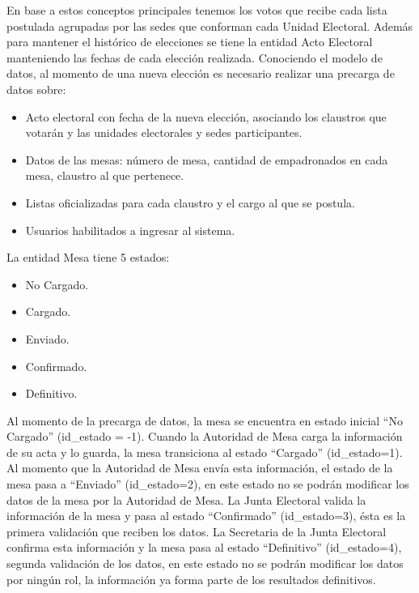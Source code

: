 En base a estos conceptos principales tenemos los votos que recibe cada lista postulada agrupadas por las sedes que conforman cada Unidad Electoral. Además para mantener el histórico de elecciones se tiene la entidad Acto Electoral manteniendo las fechas de cada elección realizada.\newline
Conociendo el modelo de datos, al momento de una nueva elección es necesario realizar una precarga de datos sobre:
\begin{itemize}
    \item Acto electoral con fecha de la nueva elección, asociando los claustros que votarán y las unidades electorales y sedes participantes.
    \item Datos de las mesas: número de mesa, cantidad de empadronados en cada mesa, claustro al que pertenece.
    \item Listas oficializadas para cada claustro y el cargo al que se postula.
    \item Usuarios habilitados a ingresar al sistema.
\end{itemize}
La entidad Mesa tiene 5 estados:
\begin{itemize}
    \item No Cargado.
    \item Cargado.
    \item Enviado.
    \item Confirmado.
    \item Definitivo.
\end{itemize}

Al momento de la precarga de datos, la mesa se encuentra en estado inicial ``No Cargado'' (id\_estado = -1). Cuando la Autoridad de Mesa carga la información de su acta y lo guarda, la mesa transiciona al estado ``Cargado'' (id\_estado=1). Al momento que la Autoridad de Mesa envía esta información, el estado de la mesa pasa a ``Enviado'' (id\_estado=2), en este estado no se podrán modificar los datos de la mesa por la Autoridad de Mesa. La Junta Electoral valida la información de la mesa y pasa al estado ``Confirmado'' (id\_estado=3), ésta es la primera validación que reciben los datos. La Secretaria de la Junta Electoral confirma esta información y la mesa pasa al estado ``Definitivo'' (id\_estado=4), segunda validación de los datos, en este estado no se podrán modificar los datos por ningún rol, la información ya forma parte de los resultados definitivos.

